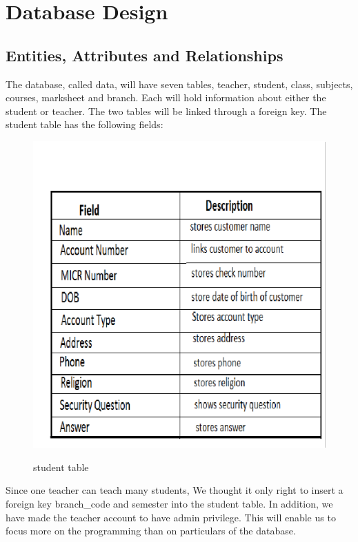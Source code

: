 \chapter{Database Design}

\section{Entities, Attributes and Relationships}
The database, called data, will have seven tables, teacher, student, class, subjects, courses, marksheet and branch. Each will hold information about either the student or teacher. The two
tables will be linked through a foreign key. The student table has the following fields:\\
\begin{figure}[H]
\centering
\caption{student table}
\includegraphics[scale=.5]{./accountUserTable.png}
\\[0.2in]
\label{fig:student table}
\end{figure}
Since one teacher can teach many students, We thought it only right to insert a foreign key
branch\_code and semester into the student table. In addition, we have made the teacher account to have admin privilege. This will
enable us to focus more on the programming than on particulars of the database.\\

